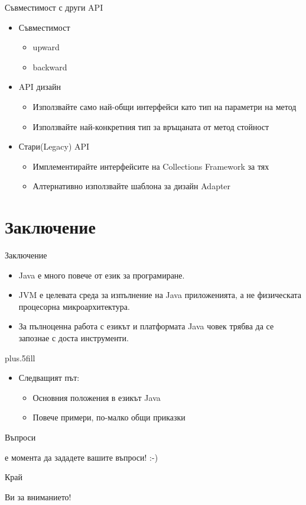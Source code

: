 \documentclass{beamer}
\begin{document}
\begin{frame}{Съвместимост с други API}
  \transdissolve
  \begin{itemize}
  \item Съвместимост
    \begin{itemize}
      \item upward
      \item backward
    \end{itemize}
    \item API дизайн
      \begin{itemize}
        \item Използвайте само най-общи интерфейси като тип на
          параметри на метод
        \item Използвайте най-конкретния тип за връщаната от метод стойност
      \end{itemize}
    \item Стари(Legacy) API
      \begin{itemize}
        \item Имплементирайте интерфейсите на Collections Framework за
          тях
        \item Алтернативно използвайте шаблона за дизайн Adapter
      \end{itemize}

  \end{itemize}
\end{frame}


\section*{Заключение}

\begin{frame}{Заключение}
  \transdissolve
  \begin{itemize}
  \item
    Java \alert{е много повече от език за програмиране}.
  \item
    JVM \alert{е целевата среда за изпълнение} на Java приложенията, а
    не физическата процесорна микроархитектура.
  \item
    За пълноценна работа с езикът и платформата Java човек трябва да
    се запознае с доста инструменти.
  \end{itemize}
  
  \vskip0pt plus.5fill
  \begin{itemize}
  \item
    Следващият път:
    \begin{itemize}
    \item
      Основния положения в езикът Java
    \item
      Повече примери, по-малко общи приказки
    \end{itemize}
  \end{itemize}
\end{frame}

\begin{frame}{Въпроси}
  \transdissolve
  \begin{center}
     е момента да зададете вашите въпроси! :-)
  \end{center}
\end{frame}

\begin{frame}{Край}
  \transdissolve
  \begin{center}
     Ви за вниманието!
  \end{center}
\end{frame}
\end{document}
